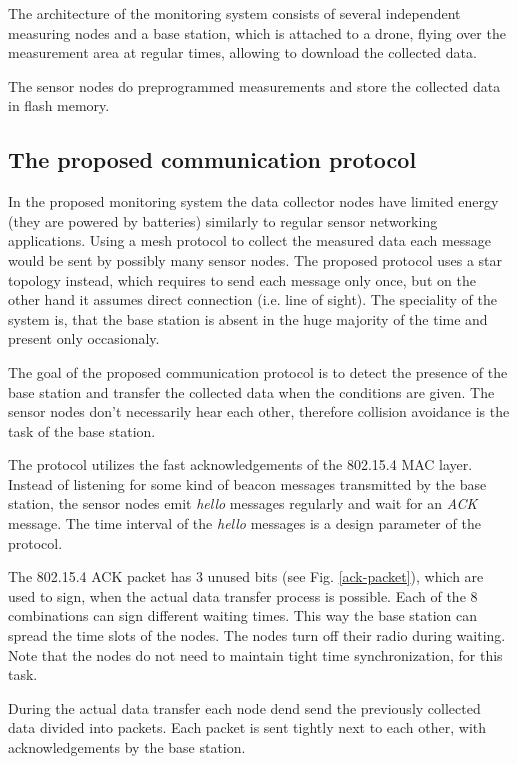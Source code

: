 \documentclass[conference]{IEEEtran}
\begin{document}
The architecture of the monitoring system consists of several independent
measuring nodes and a base station, which is attached to a drone, flying
over the measurement area at regular times, allowing to download the
collected data.

The sensor nodes do preprogrammed measurements and store the collected data
in flash memory. 

\subsection{The proposed communication protocol}

In the proposed monitoring system the data collector nodes have limited
energy (they are powered by batteries) similarly to regular sensor networking
applications. Using a mesh protocol to collect the measured data each message
would be sent by possibly many sensor nodes. The proposed protocol uses a star
topology instead, which requires to send each message only once, but on the
other hand it assumes direct connection (i.e. line of sight).
The speciality of the system is, that the base station is absent in the huge
majority of the time and present only occasionaly.

The goal of the proposed communication protocol is to detect the presence
of the base station and transfer the collected data when the conditions are
given. The sensor nodes don't necessarily hear each other, therefore collision
avoidance is the task of the base station.

The protocol utilizes the fast acknowledgements of the 802.15.4 MAC layer.
Instead of listening for some kind of beacon messages transmitted by the
base station, the sensor nodes emit \emph{hello} messages
regularly and wait for an \emph{ACK} message.
The time interval of the \emph{hello} messages is a design parameter of
the protocol.

The 802.15.4 ACK packet has 3 unused bits (see Fig. \ref{ack-packet}), which
are used to sign, when the actual data transfer process is possible.
Each of the 8 combinations can sign different waiting times. This way
the base station can spread the time slots of the nodes. The nodes turn off
their radio during waiting. Note that the nodes do not need to maintain tight
time synchronization, for this task.

During the actual data transfer each node dend send the
previously collected data divided into packets. Each packet is sent
tightly next to each other, with acknowledgements by the base station.
\end{document}
